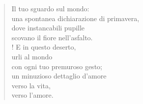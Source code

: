
\begin{verse}
Il tuo sguardo sul mondo:\\
una spontanea dichiarazione di primavera,\\
dove instancabili pupille\\
scovano il fiore nell'asfalto.\\!
E in questo deserto,\\
urli al mondo\\
con ogni tuo premuroso gesto;\\
un minuzioso dettaglio d'amore\\
verso la vita,\\
verso l'amore.
\end{verse}